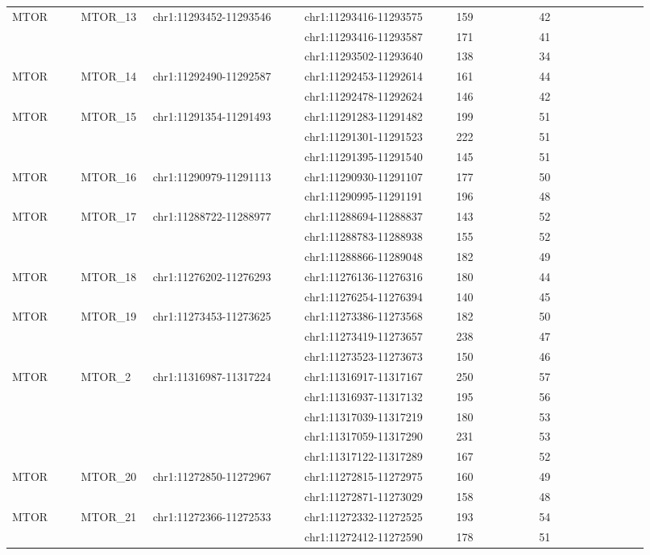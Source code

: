 \begin{landscape}
\begin{longtable}{p{0.1\linewidth}|p{0.1\linewidth}p{0.22\linewidth}p{0.22\linewidth}p{0.12\linewidth}p{0.16\linewidth}}
\\
MTOR & MTOR\_13 & chr1:11293452-11293546 & chr1:11293416-11293575 & 159 & 42
\\
 & & & chr1:11293416-11293587 & 171 & 41
\\
 & & & chr1:11293502-11293640 & 138 & 34
\\
MTOR & MTOR\_14 & chr1:11292490-11292587 & chr1:11292453-11292614 & 161 & 44
\\
 & & & chr1:11292478-11292624 & 146 & 42
\\
MTOR & MTOR\_15 & chr1:11291354-11291493 & chr1:11291283-11291482 & 199 & 51
\\
 & & & chr1:11291301-11291523 & 222 & 51
\\
 & & & chr1:11291395-11291540 & 145 & 51
\\
MTOR & MTOR\_16 & chr1:11290979-11291113 & chr1:11290930-11291107 & 177 & 50
\\
 & & & chr1:11290995-11291191 & 196 & 48
\\
MTOR & MTOR\_17 & chr1:11288722-11288977 & chr1:11288694-11288837 & 143 & 52
\\
 & & & chr1:11288783-11288938 & 155 & 52
\\
 & & & chr1:11288866-11289048 & 182 & 49
\\
MTOR & MTOR\_18 & chr1:11276202-11276293 & chr1:11276136-11276316 & 180 & 44
\\
 & & & chr1:11276254-11276394 & 140 & 45
\\
MTOR & MTOR\_19 & chr1:11273453-11273625 & chr1:11273386-11273568 & 182 & 50
\\
 & & & chr1:11273419-11273657 & 238 & 47
\\
 & & & chr1:11273523-11273673 & 150 & 46
\\
MTOR & MTOR\_2 & chr1:11316987-11317224 & chr1:11316917-11317167 & 250 & 57
\\
 & & & chr1:11316937-11317132 & 195 & 56
\\
 & & & chr1:11317039-11317219 & 180 & 53
\\
 & & & chr1:11317059-11317290 & 231 & 53
\\
 & & & chr1:11317122-11317289 & 167 & 52
\\
MTOR & MTOR\_20 & chr1:11272850-11272967 & chr1:11272815-11272975 & 160 & 49
\\
 & & & chr1:11272871-11273029 & 158 & 48
\\
MTOR & MTOR\_21 & chr1:11272366-11272533 & chr1:11272332-11272525 & 193 & 54
\\
 & & & chr1:11272412-11272590 & 178 & 51

\end{longtable}
\end{landscape}
